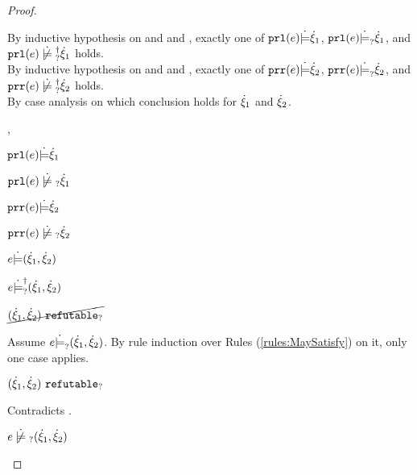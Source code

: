 \begin{proof}
\begin{byCases}
\begin{byCases}
        By inductive hypothesis on  and  and , exactly one of $\mathtt{prl}(e) \dot{\models} \dot{\xi}_1$, $\mathtt{prl}(e) \dot{\models}_{?} \dot{\xi}_1$, and $\cnotsatisfyormay{\hprl{e}}{\hxi_1}$ holds. \\
        By inductive hypothesis on  and  and , exactly one of $\mathtt{prr}(e) \dot{\models} \dot{\xi}_2$, $\mathtt{prr}(e) \dot{\models}_{?} \dot{\xi}_2$, and $\cnotsatisfyormay{\hprr{e}}{\hxi_2}$ holds. \\
        By case analysis on which conclusion holds for $\dot{\xi}_1$ and $\dot{\xi}_2$.
        \begin{byCases}
        \item[\csatisfy{\hprl{e}}{\hxi_1},\csatisfy{\hprr{e}}{\hxi_2}]
            \begin{pfsteps*}
            \item $\mathtt{prl}(e) \dot{\models} \dot{\xi}_1$  
            \item $\cnotmaysatisfy{\hprl{e}}{\hxi_1}$  
            \item $\mathtt{prr}(e) \dot{\models} \dot{\xi}_2$  
            \item $\cnotmaysatisfy{\hprr{e}}{\hxi_2}$  
            \item $e \dot{\models} (\dot{\xi}_1 , \dot{\xi}_2)$  
            \item $e \dot{\models}_{?}^{\dag} (\dot{\xi}_1 , \dot{\xi}_2)$ 
            \item $\cancel{(\dot{\xi}_1 , \dot{\xi}_2) ~\mathtt{refutable}_?}$  
            \end{pfsteps*}
            Assume $e \dot{\models}_{?} (\dot{\xi}_1 , \dot{\xi}_2)$. By rule induction over Rules (\ref{rules:MaySatisfy}) on it, only one case applies.
            \begin{byCases}
            \item[\text{(\ref{rule:CMSNotIntro})}]
                \begin{pfsteps*}
                \item $(\dot{\xi}_1 , \dot{\xi}_2) ~\mathtt{refutable}_?$ 
                \end{pfsteps*}
                Contradicts .
            \end{byCases}
            \begin{pfsteps*}
            \item $\cnotmaysatisfy{e}{\cpair{\hxi_1}{\hxi_2}}$ 
            \end{pfsteps*}
            

\end{byCases}
\end{byCases}
\end{byCases}
\end{proof}
